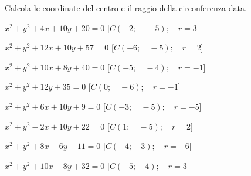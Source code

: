 \begin{esercizio}\label{ese:}
 Calcola le coordinate del centro e il raggio della circonferenza data.
 \begin{enumeratea}
  \item  \(x^2 + y^2 +4x +10y +20 = 0\)
   \hfill [\(C \left (-2; \quad -5 \right ); \quad r = 3\)]
  \item  \(x^2 + y^2 +12x +10y +57 = 0\)
   \hfill [\(C \left (-6; \quad -5 \right ); \quad r = 2\)]
  \item  \(x^2 + y^2 +10x +8y +40 = 0\)
   \hfill [\(C \left (-5; \quad -4 \right ); \quad r = -1\)]
  \item  \(x^2 + y^2 +12y +35 = 0\)
   \hfill [\(C \left (0; \quad -6 \right ); \quad r = -1\)]
  \item  \(x^2 + y^2 +6x +10y +9 = 0\)
   \hfill [\(C \left (-3; \quad -5 \right ); \quad r = -5\)]
  \item  \(x^2 + y^2 -2x +10y +22 = 0\)
   \hfill [\(C \left (1; \quad -5 \right ); \quad r = 2\)]
  \item  \(x^2 + y^2 +8x -6y -11 = 0\)
   \hfill [\(C \left (-4; \quad 3 \right ); \quad r = -6\)]
  \item  \(x^2 + y^2 +10x -8y +32 = 0\)
   \hfill [\(C \left (-5; \quad 4 \right ); \quad r = 3\)]
 \end{enumeratea}
\end{esercizio}


\subsubsection*{}

